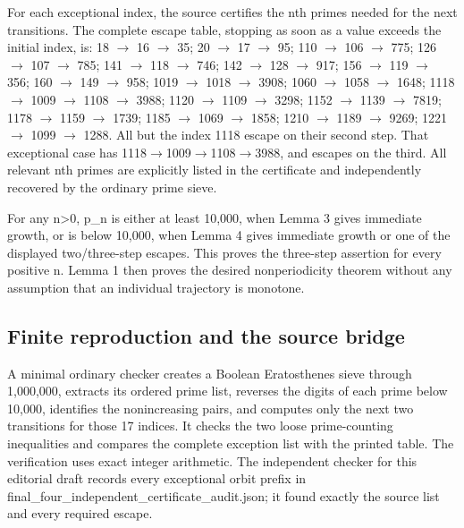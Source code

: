 \documentclass[11pt,a4paper]{article}
\begin{document}
For each exceptional index, the source certifies the nth primes needed for the next transitions. The complete escape table, stopping as soon as a value exceeds the initial index, is: 18 \ensuremath{\to} 16 \ensuremath{\to} 35; 20 \ensuremath{\to} 17 \ensuremath{\to} 95; 110 \ensuremath{\to} 106 \ensuremath{\to} 775; 126 \ensuremath{\to} 107 \ensuremath{\to} 785; 141 \ensuremath{\to} 118 \ensuremath{\to} 746; 142 \ensuremath{\to} 128 \ensuremath{\to} 917; 156 \ensuremath{\to} 119 \ensuremath{\to} 356; 160 \ensuremath{\to} 149 \ensuremath{\to} 958; 1019 \ensuremath{\to} 1018 \ensuremath{\to} 3908; 1060 \ensuremath{\to} 1058 \ensuremath{\to} 1648; 1118 \ensuremath{\to} 1009 \ensuremath{\to} 1108 \ensuremath{\to} 3988; 1120 \ensuremath{\to} 1109 \ensuremath{\to} 3298; 1152 \ensuremath{\to} 1139 \ensuremath{\to} 7819; 1178 \ensuremath{\to} 1159 \ensuremath{\to} 1739; 1185 \ensuremath{\to} 1069 \ensuremath{\to} 1858; 1210 \ensuremath{\to} 1189 \ensuremath{\to} 9269; 1221 \ensuremath{\to} 1099 \ensuremath{\to} 1288. All but the index 1118 escape on their second step. That exceptional case has 1118\ensuremath{\to}1009\ensuremath{\to}1108\ensuremath{\to}3988, and escapes on the third. All relevant nth primes are explicitly listed in the certificate and independently recovered by the ordinary prime sieve.

For any n>0, p\_n is either at least 10,000, when Lemma 3 gives immediate growth, or is below 10,000, when Lemma 4 gives immediate growth or one of the displayed two/three-step escapes. This proves the three-step assertion for every positive n. Lemma 1 then proves the desired nonperiodicity theorem without any assumption that an individual trajectory is monotone.

\subsection{Finite reproduction and the source bridge}
A minimal ordinary checker creates a Boolean Eratosthenes sieve through 1,000,000, extracts its ordered prime list, reverses the digits of each prime below 10,000, identifies the nonincreasing pairs, and computes only the next two transitions for those 17 indices. It checks the two loose prime-counting inequalities and compares the complete exception list with the printed table. The verification uses exact integer arithmetic. The independent checker for this editorial draft records every exceptional orbit prefix in final\_four\_independent\_certificate\_audit.json; it found exactly the source list and every required escape.
\end{document}
